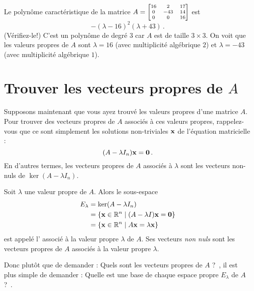 \begin{myexample}
Le polynôme caractéristique de la matrice $A=\scriptsize\left[ \begin{matrix} 16& 2 & 17 \\ 0 & -43 & 14\\ 0 & 0 & 16 \end{matrix} \right]$
est $$-(\lambda - 16)^2(\lambda + 43)\,.$$ 
(V\'erifiez-le!)  C'est un polynôme de degré $3$ car $A$ est de taille $3\times 3$. On voit que les valeurs propres de $A$ sont  
$\lambda = 16$ (avec multiplicité algébrique $2$) et $\lambda = -43$ (avec multiplicité algébrique $1$).
\end{myexample}



\section{Trouver les vecteurs propres de  $A$}

Supposons maintenant que vous ayez trouvé les valeurs propres d'une
matrice $A$.  Pour trouver des vecteurs propres de $A$ associés
à ces valeurs propres, rappelez-vous que ce sont simplement les solutions non-triviales
$\mathbf{x}$ de l'équation matricielle :
$$
( A- \lambda I_n) \mathbf{x} = \mathbf{0}\,.
$$
En d'autres termes, les vecteurs propres de $A$ associés à $\lambda$
sont les vecteurs non-nuls de $\ker( A- \lambda I_n)$.

\begin{definition}
Soit $\lambda$ une valeur propre de $A$.  Alors le sous-espace
\begin{align*}
E_\lambda &= \ker(A- \lambda I_n)\\
&= \{ \mathbf{x} \in \mathbb{R}^n \mid (A- \lambda I)\mathbf{x} = \mathbf{0} \} \\
& = \{ \mathbf{x} \in \mathbb{R}^n \mid A\mathbf{x} = \lambda \mathbf{x} \}
\end{align*}
est appelé l' associé à la valeur propre $\lambda$ de $A$.
Ses vecteurs {\it non nuls} sont les vecteurs propres de $A$ associ\'es
à la valeur propre $\lambda$.
\end{definition}

Donc plutôt que de demander : \og Quels sont les vecteurs propres de $A$ ?\ \fg, 
il est plus simple de demander : \og Quelle est une base de chaque espace propre $E_\lambda$ de $A$ ?\ \fg.

